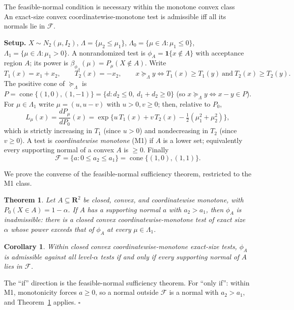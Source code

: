 \documentclass[12pt]{article}
\newtheorem{theorem}{Theorem}
\newtheorem{corollary}{Corollary}
\theoremstyle{remark}
\newcommand{\Lam}{\Lambda}
\newcommand{\R}{\mathbf R}
\newcommand{\Feas}{\mathcal F}
\newcommand{\sucL}{\succeq_\Lam}
\DeclareMathOperator{\cone}{cone}
\begin{document}
\begin{center}
{\Large The feasible-normal condition is necessary within the monotone convex class}\\[3pt]
{\small An exact-size convex coordinatewise-monotone test is admissible iff all its normals lie in $\Feas$.}
\end{center}

\medskip

\noindent\textbf{Setup.} $X\sim N_2(\mu,I_2)$, $\Lam=\{\mu_2\le\mu_1\}$, $\Lam_0=\{\mu\in\Lam:\mu_1\le0\}$, $\Lam_1=\{\mu\in\Lam:\mu_1>0\}$. A nonrandomized test is $\phi_A=\mathbf 1\{x\notin A\}$ with acceptance region $A$; its power is $\beta_{\phi_A}(\mu)=P_\mu(X\notin A)$. Write
\[
T_1(x)=x_1+x_2,\qquad T_2(x)=-x_2,\qquad
x\sucL y\iff T_1(x)\ge T_1(y)\ \text{and}\ T_2(x)\ge T_2(y).
\]
The positive cone of $\sucL$ is $P=\cone\{(1,0),(1,-1)\}=\{d:d_2\le0,\ d_1+d_2\ge0\}$ (so $x\sucL y\iff x-y\in P$). For $\mu\in\Lam_1$ write $\mu=(u,u-v)$ with $u>0,v\ge0$; then, relative to $P_0$,
\[
L_\mu(x)=\frac{dP_\mu}{dP_0}(x)=\exp\!\Big\{u\,T_1(x)+v\,T_2(x)-\tfrac12(\mu_1^2+\mu_2^2)\Big\},
\tag{$\ast$}
\]
which is strictly increasing in $T_1$ (since $u>0$) and nondecreasing in $T_2$ (since $v\ge0$). A test is \emph{coordinatewise monotone} (M1) if $A$ is a lower set; equivalently every supporting normal of a convex $A$ is $\ge0$. Finally
\[
\Feas=\{a:0\le a_2\le a_1\}=\cone\{(1,0),(1,1)\}.
\]

We prove the converse of the feasible-normal sufficiency theorem, restricted to the M1 class.

\begin{theorem}\label{thm:nec}
Let $A\subseteq\R^2$ be closed, convex, and coordinatewise monotone, with $P_0(X\in A)=1-\alpha$. If $A$ has a supporting normal $a$ with $a_2>a_1$, then $\phi_A$ is inadmissible: there is a closed convex coordinatewise-monotone test of exact size $\alpha$ whose power exceeds that of $\phi_A$ at \emph{every} $\mu\in\Lam_1$.
\end{theorem}

\begin{corollary}\label{cor:iff}
Within closed convex coordinatewise-monotone exact-size tests, $\phi_A$ is admissible against all level-$\alpha$ tests if and only if every supporting normal of $A$ lies in $\Feas$.
\end{corollary}

\noindent The ``if'' direction is the feasible-normal sufficiency theorem. For ``only if'': within M1, monotonicity forces $a\ge0$, so a normal outside $\Feas$ is a normal with $a_2>a_1$, and Theorem~\ref{thm:nec} applies. \hfill$\square$
\end{document}
